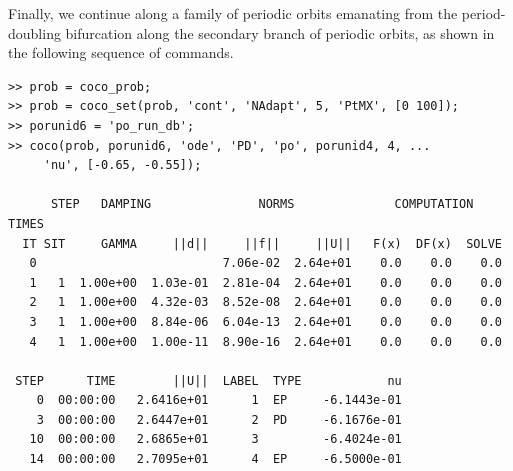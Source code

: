 Finally, we continue along a family of periodic orbits emanating from the period-doubling bifurcation along the secondary branch of periodic orbits, as shown in the following sequence of commands.
\begin{lstlisting}[language=coco-highlight,frame=lines]
>> prob = coco_prob;
>> prob = coco_set(prob, 'cont', 'NAdapt', 5, 'PtMX', [0 100]);
>> porunid6 = 'po_run_db';
>> coco(prob, porunid6, 'ode', 'PD', 'po', porunid4, 4, ...
     'nu', [-0.65, -0.55]);
  
      STEP   DAMPING               NORMS              COMPUTATION TIMES
  IT SIT     GAMMA     ||d||     ||f||     ||U||   F(x)  DF(x)  SOLVE
   0                          7.06e-02  2.64e+01    0.0    0.0    0.0
   1   1  1.00e+00  1.03e-01  2.81e-04  2.64e+01    0.0    0.0    0.0
   2   1  1.00e+00  4.32e-03  8.52e-08  2.64e+01    0.0    0.0    0.0
   3   1  1.00e+00  8.84e-06  6.04e-13  2.64e+01    0.0    0.0    0.0
   4   1  1.00e+00  1.00e-11  8.90e-16  2.64e+01    0.0    0.0    0.0

 STEP      TIME        ||U||  LABEL  TYPE            nu
    0  00:00:00   2.6416e+01      1  EP     -6.1443e-01
    3  00:00:00   2.6447e+01      2  PD     -6.1676e-01
   10  00:00:00   2.6865e+01      3         -6.4024e-01
   14  00:00:00   2.7095e+01      4  EP     -6.5000e-01
\end{lstlisting}

